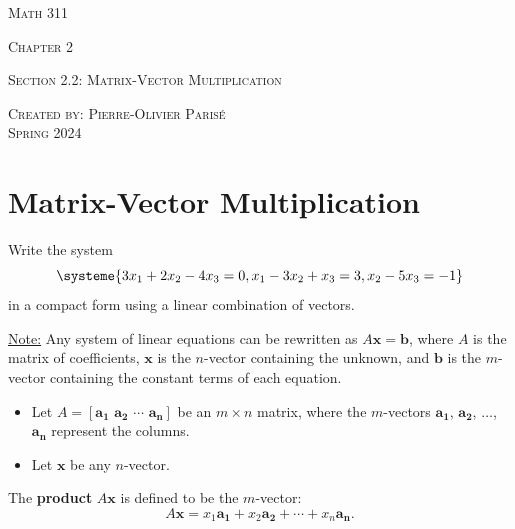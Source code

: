 \documentclass[20pt,a4paper]{extarticle}
\newcounter{example}[section]
\newcounter{definition}[section]
\begin{document}
\thispagestyle{empty}

\begin{center}
\vspace*{2.5cm}

{\Huge \textsc{Math 311}}

\vspace*{1.5cm}

{\LARGE \textsc{Chapter 2}} 

\vspace*{0.75cm}

\noindent\textsc{Section 2.2: Matrix-Vector Multiplication}

\vspace*{0.75cm}

\tableofcontents

\vfill

\noindent \textsc{Created by: Pierre-Olivier Paris{\'e}} \\
\textsc{Spring 2024}
\end{center}

\newpage

\section{Matrix-Vector Multiplication}

\begin{example}
Write the system
	\[
		\systeme{3x_1 + 2x_2 - 4x_3 = 0, x_1 - 3x_2 + x_3 = 3, x_2 - 5x_3 = -1}
	\]
in a compact form using a linear combination of vectors.
\end{example}

\begin{solution}

\end{solution}

\vfill 

\underline{Note:} Any system of linear equations can be rewritten as $A \mathbf{x} = \mathbf{b}$, where $A$ is the matrix of coefficients, $\mathbf{x}$ is the $n$-vector containing the unknown, and $\mathbf{b}$ is the $m$-vector containing the constant terms of each equation.

\newpage 

\begin{definition}
	\begin{itemize}
	\item Let $A = [\mathbf{a_1} \,\, \mathbf{a_2} \, \, \cdots \, \, \mathbf{a_n} ]$ be an $m \times n$ matrix, where the $m$-vectors $\mathbf{a_1}$, $\mathbf{a_2}$, $\ldots$, $\mathbf{a_n}$ represent the columns. 
	\item Let $\mathbf{x}$ be any $n$-vector. 
	\end{itemize}
The \textbf{product} $A \mathbf{x}$ is defined to be the $m$-vector:
	\[
		A \mathbf{x} = x_1 \mathbf{a_1} + x_2 \mathbf{a_2} + \cdots + x_n \mathbf{a_n} .
	\]
\end{definition}
\end{document}
